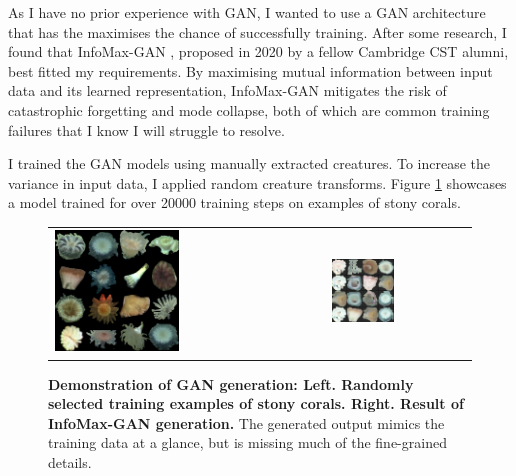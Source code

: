 \documentclass[12pt,a4paper,twoside,openany]{report}
\begin{document}
As I have no prior experience with GAN, I wanted to use a GAN architecture that has the maximises the chance of successfully training. After some research, I found that InfoMax-GAN \cite{lee_infomax-gan_2020}, proposed in 2020 by a fellow Cambridge CST alumni, best fitted my requirements. By maximising mutual information between input data and its learned representation, InfoMax-GAN mitigates the risk of catastrophic forgetting and mode collapse, both of which are common training failures that I know I will struggle to resolve.


I trained the GAN models using manually extracted creatures. To increase the variance in input data, I applied random creature transforms. Figure \ref{Fig:gan_gallary} showcases a model trained for over 20000 training steps on examples of stony corals.

\begin{figure}[H]
\begin{tabular}{ll}
\includegraphics[width=0.47\textwidth]{figs/implementation/gan/actual.jpg} &
\includegraphics[width=0.47\textwidth]{figs/implementation/gan/generated.png}
\end{tabular}
\caption{\textbf{Demonstration of GAN generation: Left. Randomly selected training examples of stony corals. Right. Result of InfoMax-GAN generation.} The generated output mimics the training data at a glance, but is missing much of the fine-grained details. }
\label{Fig:gan_gallary}
\end{figure}
\end{document}
